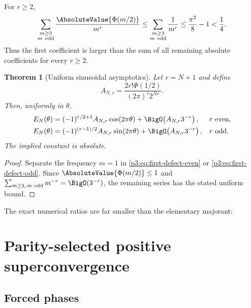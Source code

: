 \documentclass[11pt,oneside]{article}
\numberwithin{equation}{section}
\newtheorem{theorem}{Theorem}[section]
\theoremstyle{definition}
\theoremstyle{remark}
\begin{document}
For $r\ge2$,
\begin{equation}
 \sum_{\substack{m\ge3\\m\ \mathrm{odd}}}
 \frac{\AbsoluteValue{\Phi(m/2)}}{m^r}
 \le\sum_{\substack{m\ge3\\m\ \mathrm{odd}}}\frac1{m^r}
 \le\frac{\pi^2}{8}-1<\frac14.
 \label{p3:eq:harmonic-tail-bound}
\end{equation}
Thus the first coefficient is larger than the sum of all remaining absolute coefficients for every $r\ge2$.

\begin{theorem}[Uniform sinusoidal asymptotics]
\label{p3:thm:sinusoidal-asymptotics}
Let $r=N+1$ and define
\begin{equation}
 A_{N,r}=\frac{2r!\Phi(1/2)}{(2\pi)^r2^{Nr}}.
 \label{p3:eq:first-harmonic-amplitude}
\end{equation}
Then, uniformly in $\theta$,
\begin{align}
 E_N(\theta)
 &=(-1)^{r/2+1}A_{N,r}\cos(2\pi\theta)
 +\BigO\!\left(A_{N,r}3^{-r}\right),&&r\ \text{even},
 \label{p3:eq:cos-asymptotic}\\
 E_N(\theta)
 &=(-1)^{(r-1)/2}A_{N,r}\sin(2\pi\theta)
 +\BigO\!\left(A_{N,r}3^{-r}\right),&&r\ \text{odd}.
 \label{p3:eq:sin-asymptotic}
\end{align}
The implied constant is absolute.
\end{theorem}

\begin{proof}
Separate the frequency $m=1$ in \eqref{p3:eq:first-defect-even} or \eqref{p3:eq:first-defect-odd}.  Since $\AbsoluteValue{\Phi(m/2)}\le1$ and
$\sum_{m\ge3,\,m\text{ odd}}m^{-r}=\BigO(3^{-r})$, the remaining series has the stated uniform bound.
\end{proof}

The exact numerical ratios are far smaller than the elementary majorant:
\begin{table}[H]
\centering
\caption{Absolute spectral tail divided by the first harmonic.}
\label{p3:tab:harmonic-tail}

\end{table}

\section{Parity-selected positive superconvergence}
\label{p3:sec:superconvergence}

\subsection{Forced phases}
\end{document}
